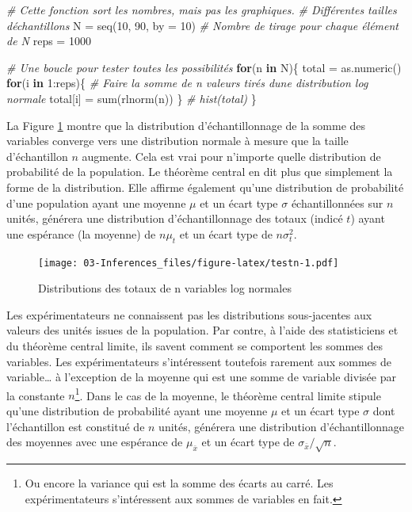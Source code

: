 \documentclass[
]{book}
\newenvironment{Shaded}{}{}
\newcommand{\AttributeTok}[1]{#1}
\newcommand{\CommentTok}[1]{\textit{#1}}
\newcommand{\ControlFlowTok}[1]{\textbf{#1}}
\newcommand{\DecValTok}[1]{#1}
\newcommand{\FunctionTok}[1]{#1}
\newcommand{\NormalTok}[1]{#1}
\newcommand{\OtherTok}[1]{#1}
\newcommand{\SpecialCharTok}[1]{#1}
\begin{document}
\begin{Shaded}
\begin{Highlighting}[]
\CommentTok{\# Cette fonction sort les nombres, mais pas les graphiques.}
\CommentTok{\# Différentes tailles d\textquotesingle{}échantillons}
\NormalTok{N }\OtherTok{=} \FunctionTok{seq}\NormalTok{(}\DecValTok{10}\NormalTok{, }\DecValTok{90}\NormalTok{, }\AttributeTok{by =} \DecValTok{10}\NormalTok{)}
\CommentTok{\# Nombre de tirage pour chaque élément de N}
\NormalTok{reps }\OtherTok{=} \DecValTok{1000}

\CommentTok{\# Une boucle pour tester toutes les possibilités}
\ControlFlowTok{for}\NormalTok{(n }\ControlFlowTok{in}\NormalTok{ N)\{}
\NormalTok{  total }\OtherTok{=} \FunctionTok{as.numeric}\NormalTok{()}
  \ControlFlowTok{for}\NormalTok{(i }\ControlFlowTok{in} \DecValTok{1}\SpecialCharTok{:}\NormalTok{reps)\{}
    \CommentTok{\# Faire la somme de n valeurs tirés d\textquotesingle{}une distribution log normale}
\NormalTok{    total[i] }\OtherTok{=} \FunctionTok{sum}\NormalTok{(}\FunctionTok{rlnorm}\NormalTok{(n))}
\NormalTok{  \}}
  \CommentTok{\# hist(total) }
\NormalTok{\}}
\end{Highlighting}
\end{Shaded}

La Figure \ref{fig:testn} montre que la distribution d'échantillonnage de la somme des variables converge vers une distribution normale à mesure que la taille d'échantillon \(n\) augmente. Cela est vrai pour n'importe quelle distribution de probabilité de la population. Le théorème central en dit plus que simplement la forme de la distribution. Elle affirme également qu'une distribution de probabilité d'une population ayant une moyenne \(\mu\) et un écart type \(\sigma\) échantillonnées sur \(n\) unités, générera une distribution d'échantillonnage des totaux (indicé \(t\)) ayant une espérance (la moyenne) de \(n\mu_t\) et un écart type de \(n\sigma_t^2\).

\begin{figure}
\centering
\texttt{[image: 03-Inferences\_files/figure-latex/testn-1.pdf]}
\caption{\label{fig:testn}Distributions des totaux de n variables log normales}
\end{figure}

Les expérimentateurs ne connaissent pas les distributions sous-jacentes aux valeurs des unités issues de la population. Par contre, à l'aide des statisticiens et du théorème central limite, ils savent comment se comportent les sommes des variables. Les expérimentateurs s'intéressent toutefois rarement aux sommes de variable\ldots{} à l'exception de la moyenne qui est une somme de variable divisée par la constante \(n\)\footnote{Ou encore la variance qui est la somme des écarts au carré. Les expérimentateurs s'intéressent aux sommes de variables en fait.}. Dans le cas de la moyenne, le théorème central limite stipule qu'une distribution de probabilité ayant une moyenne \(\mu\) et un écart type \(\sigma\) dont l'échantillon est constitué de \(n\) unités, générera une distribution d'échantillonnage des moyennes avec une espérance de \(\mu_{\bar{x}}\) et un écart type de \(\sigma_{\bar{x}}/\sqrt{n}\).
\end{document}

